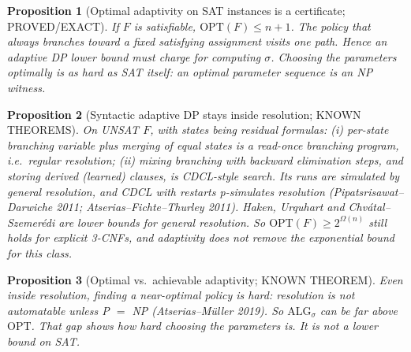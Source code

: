 \documentclass[11pt]{article}
\newtheorem{prop}{Proposition}
\begin{document}
\begin{prop}[Optimal adaptivity on SAT instances is a certificate; PROVED/EXACT]
If $F$ is satisfiable, $\mathrm{OPT}(F)\le n+1$. The policy that always branches toward a fixed
satisfying assignment visits one path. Hence an adaptive DP lower bound \emph{must} charge for
computing $\sigma$. Choosing the parameters optimally is as hard as SAT itself: an optimal parameter sequence \emph{is} an NP witness.
\end{prop}

\begin{prop}[Syntactic adaptive DP stays inside resolution; KNOWN THEOREMS]
On UNSAT $F$, with states being residual formulas:
(i) per-state branching variable plus merging of equal states is a read-once branching
program, i.e.\ regular resolution;
(ii) mixing branching with backward elimination steps, and storing derived (learned) clauses,
is CDCL-style search. Its runs are simulated by general resolution, and CDCL with restarts
p-simulates resolution (Pipatsrisawat--Darwiche 2011; Atserias--Fichte--Thurley 2011).
Haken, Urquhart and Chvátal--Szemerédi are lower bounds for \emph{general} resolution.
So $\mathrm{OPT}(F)\ge 2^{\Omega(n)}$ still holds for explicit 3-CNFs, and adaptivity does not
remove the exponential bound for this class.
\end{prop}

\begin{prop}[Optimal vs.\ achievable adaptivity; KNOWN THEOREM]
Even inside resolution, finding a near-optimal policy is hard: resolution is not
automatable unless P $=$ NP (Atserias--Müller 2019). So $\mathrm{ALG}_\sigma$ can be far above
$\mathrm{OPT}$. That gap shows how hard \emph{choosing} the parameters is. It is not a lower bound on SAT.
\end{prop}
\end{document}

